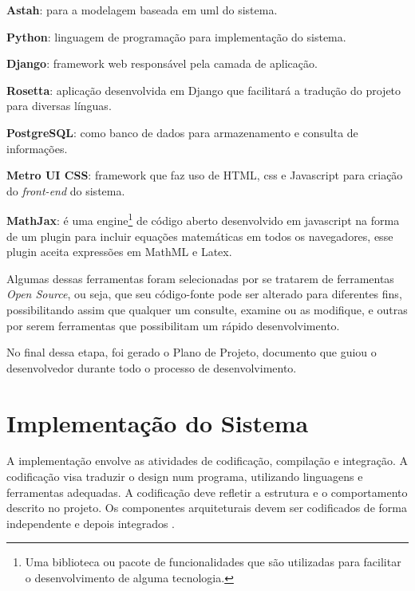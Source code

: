 \begin{alineas}
	\item \textbf{Astah}: para a modelagem baseada em \acrshort{uml} do sistema.
	\item \textbf{Python}: linguagem de programação para implementação do sistema.
    \item \textbf{Django}: framework web responsável pela camada de aplicação.
    \item \textbf{Rosetta}: aplicação desenvolvida em Django que facilitará a tradução do projeto para diversas línguas.  
    \item \textbf{PostgreSQL}: como banco de dados para armazenamento e consulta de informações.
    \item \textbf{Metro UI CSS}: framework que faz uso de HTML, \gls{css} e Javascript para criação do \textit{front-end} do sistema.
    \item \textbf{MathJax}: \'e uma engine\footnote{Uma biblioteca ou pacote de funcionalidades que são utilizadas para facilitar o desenvolvimento de alguma tecnologia.} de código aberto 
desenvolvido em 
javascript na forma de um plugin para incluir equações matemáticas em todos os navegadores, esse plugin aceita expressões em  MathML e Latex.

\end{alineas}

Algumas dessas ferramentas foram selecionadas por se tratarem de ferramentas \textit{Open Source}, ou seja, que seu código-fonte pode ser 
alterado para diferentes fins, possibilitando assim que qualquer um consulte, examine ou as modifique, e outras por serem ferramentas que 
possibilitam um rápido desenvolvimento.

No final dessa etapa, foi gerado o Plano de Projeto, documento que guiou o desenvolvedor durante todo o processo de desenvolvimento.

\section{Implementação do Sistema}

A implementação envolve as atividades de codificação, compilação e integração. A codificação visa traduzir o design num programa, utilizando linguagens e  ferramentas adequadas. A codificação 
deve refletir a estrutura e o comportamento descrito no projeto. Os componentes arquiteturais devem ser codificados de forma independente e depois integrados \cite{aguiar2012requisitos}.

